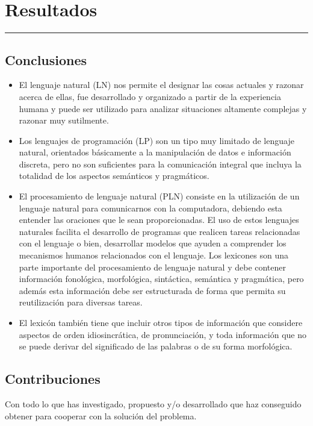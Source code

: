 \chapter{Resultados}
\hrule \bigskip \vspace*{1cm}

\section{Conclusiones}
\begin{itemize}
  \item El lenguaje natural (LN) nos permite el designar las cosas actuales y razonar acerca de ellas, fue desarrollado y organizado a partir de la experiencia humana y puede ser utilizado para analizar situaciones altamente complejas y razonar muy sutilmente. 
 \item  Los lenguajes de programación (LP) son un tipo muy limitado de lenguaje natural, orientados básicamente a la manipulación de datos e información discreta, pero no son suficientes para la comunicación integral que incluya la totalidad de los aspectos semánticos y pragmáticos.
 \item  El procesamiento de lenguaje natural (PLN) consiste en la utilización de un lenguaje natural para comunicarnos con la computadora, debiendo esta entender las oraciones que le sean proporcionadas. El uso de estos lenguajes naturales facilita el desarrollo de programas que realicen tareas relacionadas con el lenguaje o bien, desarrollar modelos que ayuden a comprender los mecanismos humanos relacionados con el lenguaje. Los lexicones son una parte importante del procesamiento de lenguaje natural y debe contener información fonológica, morfológica, sintáctica, semántica y pragmática, pero además esta información debe ser estructurada de forma que permita su reutilización para diversas tareas.
 \item  El lexicón también tiene que incluir otros tipos de información que considere aspectos de orden idiosincrática, de pronunciación, y toda información que no se puede derivar del significado de las palabras o de su forma morfológica.
\end{itemize}

\section{Contribuciones}

Con todo lo que has investigado, propuesto y/o desarrollado que haz
conseguido obtener para cooperar con la solución del problema.

